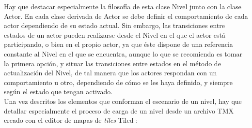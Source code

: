 Hay que destacar especialmente la filosofía de esta clase Nivel junto con la clase Actor. En cada clase derivada de Actor se debe definir el comportamiento de cada actor dependiendo de su estado actual. Sin embargo, las transiciones entre estados de un actor pueden realizarse desde el Nivel en el que el actor está participando, o bien en el propio actor, ya que éste dispone de una referencia constante al Nivel en el que se encuentra, aunque lo que se recomienda es tomar la primera opción, y situar las transiciones entre estados en el método de actualización del Nivel, de tal manera que los actores respondan con un comportamiento u otro, dependiendo de cómo se les haya definido, y siempre según el estado que tengan activado.\\

Una vez descritos los elementos que conforman el escenario de un nivel, hay que detallar especialmente el proceso de carga de un nivel desde un archivo TMX creado con el editor de mapas de \emph{tiles} Tiled \cite{website:tiled}:


